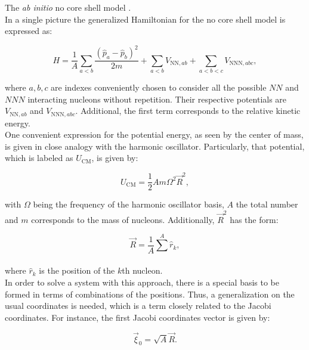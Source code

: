 \documentclass[openany]{book}
\begin{document}
The \textit{ab initio} no core shell model \cite{barrett_navratil_vary_2013}. \\

In a single picture the generalized Hamiltonian for the no core shell model is expressed as: 

\begin{equation}\label{eq:micro_NCSM_hamiltonian}
	H = \frac{1}{A} \sum_{a < b} \frac{(\hat p_a - \hat p_b)^2}{2m} + \sum_{a<b} V_{\mathrm{NN}, ab} +  \sum_{a<b < c} V_{\mathrm{NNN}, abc},
\end{equation}

where $a, b, c$ are indexes conveniently chosen to consider all the possible $NN$ and $NNN$ interacting nucleons without repetition. Their respective potentials are $V_{\mathrm{NN}, ab}$ and  $V_{\mathrm{NNN}, abc}$.  Additional, the first term corresponds to the relative kinetic energy. \\

One convenient expression for the potential energy, as seen by the center of mass, is given in close analogy with the harmonic oscillator. Particularly, that potential, which is labeled as $U_{\mathrm{CM}}$, is given by:

\begin{equation}\label{eq:micro_NCSM_potentialHarmonic}
	U_{\mathrm{CM}} = \frac{1}{2} A m \Omega^2 \vec {R}^2,
\end{equation}

with $\Omega$ being the frequency of the harmonic oscillator basis, $A$ the total number  and $m$ corresponds to the mass of nucleons. Additionally, $\vec {R}^2$ has the form: 

\begin{equation}\label{eq:micro_NCSM_R}
	\vec R = \frac{1}{A}\sum_{}^{A} \hat r_k, 
\end{equation}

where $\hat r_k$ is the position of the $k$th nucleon. \\

In order to solve a system with this approach, there is a special basis to be formed in terms of combinations of the positions. Thus, a generalization on the usual coordinates is needed, which is a term closely related to the Jacobi coordinates. For instance, the first Jacobi coordinates vector is given by: 

\begin{equation}\label{eq:micro_NCSM_jacobi0}
	\vec \xi_0 = \sqrt{A} \vec R.
\end{equation}
\end{document}
